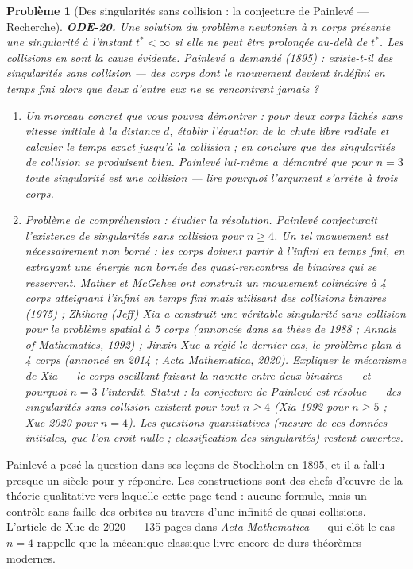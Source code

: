 \documentclass[11pt]{article}
\newtheorem{problem}{Problème}
\begin{document}
\bigskip

\begin{problem}[{Des singularités sans collision : la conjecture de Painlevé --- Recherche}]
\textbf{ODE-20.} Une solution du problème newtonien à $ n $ corps présente une
\textit{singularité} à l'instant $ t^* <\infty $ si elle ne peut être prolongée au-delà de
$ t^* $. Les collisions en sont la cause évidente. Painlevé a demandé (1895) : existe-t-il des
singularités \textit{sans} collision --- des corps dont le mouvement devient indéfini en temps fini
alors que deux d'entre eux ne se rencontrent jamais ?
\begin{enumerate}
\item[(a)] Un morceau concret que vous pouvez démontrer : pour deux corps lâchés sans vitesse initiale à
la distance $ d $, établir l'équation de la chute libre radiale et calculer le temps exact
jusqu'à la collision ; en conclure que des singularités de collision se produisent bien. Painlevé
lui-même a démontré que pour $ n = 3 $ \textit{toute} singularité est une collision --- lire
pourquoi l'argument s'arrête à trois corps.
\item[(b)] Problème de compréhension : étudier la résolution. Painlevé conjecturait l'existence de
singularités sans collision pour $ n \ge 4 $. Un tel mouvement est nécessairement non borné :
les corps doivent partir à l'infini en temps fini, en extrayant une énergie non bornée des
quasi-rencontres de binaires qui se resserrent. Mather et McGehee ont construit un mouvement
colinéaire à 4 corps atteignant l'infini en temps fini mais utilisant des collisions binaires
(1975) ; Zhihong (Jeff) Xia a construit une véritable singularité sans collision pour le problème
spatial à 5 corps (annoncée dans sa thèse de 1988 ; \textit{Annals of Mathematics}, 1992) ; Jinxin
Xue a réglé le dernier cas, le problème plan à 4 corps (annoncé en 2014 ; \textit{Acta Mathematica},
2020). Expliquer le mécanisme de Xia --- le corps oscillant faisant la navette entre deux binaires ---
et pourquoi $ n = 3 $ l'interdit.
\textit{Statut : la conjecture de Painlevé est résolue --- des singularités sans collision existent pour
tout $ n \ge 4 $ (Xia 1992 pour $ n \ge 5 $ ; Xue 2020 pour $ n = 4 $). Les questions
quantitatives (mesure de ces données initiales, que l'on croit nulle ; classification des
singularités) restent ouvertes.}
\end{enumerate}

\end{problem}

\noindent Painlevé a posé la question dans ses leçons de Stockholm en 1895, et il a fallu
presque un siècle pour y répondre. Les constructions sont des chefs-d'\oe{}uvre de la théorie
qualitative vers laquelle cette page tend : aucune formule, mais un contrôle sans faille des
orbites au travers d'une infinité de quasi-collisions. L'article de Xue de 2020 --- 135 pages dans
\textit{Acta Mathematica} --- qui clôt le cas $ n = 4 $ rappelle que la mécanique classique livre
encore de durs théorèmes modernes.
\end{document}
